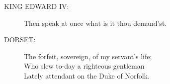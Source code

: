 \documentclass{article}
\begin{document}
\begin{description}
\item[KING EDWARD IV:] 
\hspace{1pt}Then speak at once what is it thou demand'st.\\
\end{description}
\begin{description}
\item[DORSET:] 
\hspace{1pt}The forfeit, sovereign, of my servant's life;\\
\hspace{1pt}Who slew to-day a righteous gentleman\\
\hspace{1pt}Lately attendant on the Duke of Norfolk.\\
\end{description}
\end{document}
